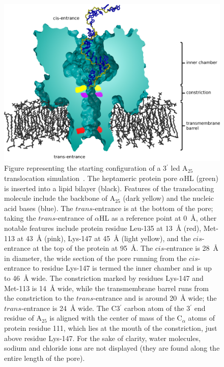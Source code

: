 \documentclass[a4paper,10pt]{article}
\newcommand{\atf}{A$_{25}$ }
\newcommand{\ahl}{$\alpha$HL }
\newcommand{\prim}{$^{\prime}$ }
\begin{document}
\begin{figure}[!h]
  \begin{center}
    \includegraphics[width=5.0in]{ahl_labelled13}
  \end{center}
  \caption{Figure representing the starting configuration of a 3\prim led \atf translocation simulation~\cite{martin-determination}. The heptameric protein pore \ahl (green) is inserted into a lipid bilayer (black). Features of the translocating molecule include the backbone of \atf (dark yellow) and the nucleic acid bases (blue). The $trans$-entrance is at the bottom of the pore; taking the $trans$-entrance of \ahl as a reference point at 0~{\AA}, other notable features include protein residue Leu-135 at 13~{\AA} (red), Met-113 at 43~{\AA} (pink), Lys-147 at 45~{\AA} (light yellow), and the $cis$-entrance at the top of the protein at 95~{\AA}. The $cis$-entrance is 28~{\AA} in diameter, the wide section of the pore running from the $cis$-entrance to residue Lys-147 is termed the inner chamber and is up to 46~{\AA} wide. The constriction marked by residues Lys-147 and Met-113 is 14~{\AA} wide, while the transmembrane barrel runs from the constriction to the $trans$-entrance and is around 20~{\AA} wide; the $trans$-entrance is 24~{\AA} wide. The C3\prim carbon atom of the 3\prim end residue of \atf is aligned with the center of mass of the C$_{\alpha}$ atoms of protein residue 111, which lies at the mouth of the constriction, just above residue Lys-147. For the sake of clarity, water molecules, sodium and chloride ions are not displayed (they are found along the entire length of the pore).}
  \label{fig:edge}
\end{figure} 
\end{document}
